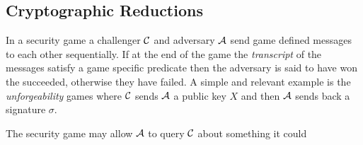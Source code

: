 

\subsection{Cryptographic Reductions}




In a security game a challenger $\mathcal{C}$ and adversary $\mathcal{A}$ send game defined messages to each other sequentially.
If at the end of the game the \emph{transcript} of the messages satisfy a game specific predicate then the adversary is said to have won the succeeded, otherwise they have failed.
A simple and relevant example is the \emph{unforgeability} games where $\mathcal{C}$ sends $\mathcal{A}$ a public key $X$ and then $\mathcal{A}$ sends back a signature $\sigma$.



The security game may allow $\mathcal{A}$ to query $\mathcal{C}$ about something it could


